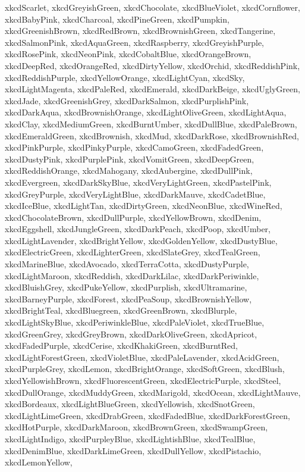 \documentclass[12pt]{article}
\begin{document}
{{xkcdScarlet,
xkcdGreyishGreen,
xkcdChocolate,
xkcdBlueViolet,
xkcdCornflower,
xkcdBabyPink,
xkcdCharcoal,
xkcdPineGreen,
xkcdPumpkin,
xkcdGreenishBrown,
xkcdRedBrown,
xkcdBrownishGreen,
xkcdTangerine,
xkcdSalmonPink,
xkcdAquaGreen,
xkcdRaspberry,
xkcdGreyishPurple,
xkcdRosePink,
xkcdNeonPink,
xkcdCobaltBlue,
xkcdOrangeBrown,
xkcdDeepRed,
xkcdOrangeRed,
xkcdDirtyYellow,
xkcdOrchid,
xkcdReddishPink,
xkcdReddishPurple,
xkcdYellowOrange,
xkcdLightCyan,
xkcdSky,
xkcdLightMagenta,
xkcdPaleRed,
xkcdEmerald,
xkcdDarkBeige,
xkcdUglyGreen,
xkcdJade,
xkcdGreenishGrey,
xkcdDarkSalmon,
xkcdPurplishPink,
xkcdDarkAqua,
xkcdBrownishOrange,
xkcdLightOliveGreen,
xkcdLightAqua,
xkcdClay,
xkcdMediumGreen,
xkcdBurntUmber,
xkcdDullBlue,
xkcdPaleBrown,
xkcdEmeraldGreen,
xkcdBrownish,
xkcdMud,
xkcdDarkRose,
xkcdBrownishRed,
xkcdPinkPurple,
xkcdPinkyPurple,
xkcdCamoGreen,
xkcdFadedGreen,
xkcdDustyPink,
xkcdPurplePink,
xkcdVomitGreen,
xkcdDeepGreen,
xkcdReddishOrange,
xkcdMahogany,
xkcdAubergine,
xkcdDullPink,
xkcdEvergreen,
xkcdDarkSkyBlue,
xkcdVeryLightGreen,
xkcdPastelPink,
xkcdGreyPurple,
xkcdVeryLightBlue,
xkcdDarkMauve,
xkcdCadetBlue,
xkcdIceBlue,
xkcdLightTan,
xkcdDirtyGreen,
xkcdNeonBlue,
xkcdWineRed,
xkcdChocolateBrown,
xkcdDullPurple,
xkcdYellowBrown,
xkcdDenim,
xkcdEggshell,
xkcdJungleGreen,
xkcdDarkPeach,
xkcdPoop,
xkcdUmber,
xkcdLightLavender,
xkcdBrightYellow,
xkcdGoldenYellow,
xkcdDustyBlue,
xkcdElectricGreen,
xkcdLighterGreen,
xkcdSlateGrey,
xkcdTealGreen,
xkcdMarineBlue,
xkcdAvocado,
xkcdTerraCotta,
xkcdDustyPurple,
xkcdLightMaroon,
xkcdReddish,
xkcdDarkLilac,
xkcdDarkPeriwinkle,
xkcdBluishGrey,
xkcdPukeYellow,
xkcdPurplish,
xkcdUltramarine,
xkcdBarneyPurple,
xkcdForest,
xkcdPeaSoup,
xkcdBrownishYellow,
xkcdBrightTeal,
xkcdBluegreen,
xkcdGreenBrown,
xkcdBlurple,
xkcdLightSkyBlue,
xkcdPeriwinkleBlue,
xkcdPaleViolet,
xkcdTrueBlue,
xkcdGreenGrey,
xkcdGreyBrown,
xkcdDarkOliveGreen,
xkcdApricot,
xkcdFadedPurple,
xkcdCerise,
xkcdKhakiGreen,
xkcdBurntRed,
xkcdLightForestGreen,
xkcdVioletBlue,
xkcdPaleLavender,
xkcdAcidGreen,
xkcdPurpleGrey,
xkcdLemon,
xkcdBrightOrange,
xkcdSoftGreen,
xkcdBlush,
xkcdYellowishBrown,
xkcdFluorescentGreen,
xkcdElectricPurple,
xkcdSteel,
xkcdDullOrange,
xkcdMuddyGreen,
xkcdMarigold,
xkcdOcean,
xkcdLightMauve,
xkcdBordeaux,
xkcdLightBlueGreen,
xkcdYellowish,
xkcdSnotGreen,
xkcdLightLimeGreen,
xkcdDrabGreen,
xkcdFadedBlue,
xkcdDarkForestGreen,
xkcdHotPurple,
xkcdDarkMaroon,
xkcdBrownGreen,
xkcdSwampGreen,
xkcdLightIndigo,
xkcdPurpleyBlue,
xkcdLightishBlue,
xkcdTealBlue,
xkcdDenimBlue,
xkcdDarkLimeGreen,
xkcdDullYellow,
xkcdPistachio,
xkcdLemonYellow,
}}
\end{document}
